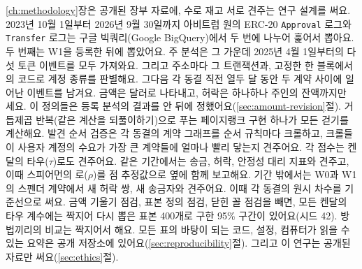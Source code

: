 \ref{ch:methodology}장은 공개된 장부 자료에, 수로 재고 서로 견주는 연구 설계를 써요. 2023년 10월 1일부터 2026년 9월 30일까지 아비트럼 원의 ERC-20 \texttt{Approval} 로그와 \texttt{Transfer} 로그는 구글 빅쿼리(Google BigQuery)에서 두 번에 나누어 훑어서 뽑아요. 두 번째는 W1을 등록한 뒤에 뽑았어요. 주 분석은 그 가운데 2025년 4월 1일부터의 다섯 토큰 이벤트를 모두 가져와요. 그리고 주소마다 그 트랜잭션과, 고정한 한 블록에서의 코드로 계정 종류를 판별해요. 그다음 각 동결 직전 열두 달 동안 두 계약 사이에 일어난 이벤트를 남겨요. 금액은 달러로 나타내고, 허락은 하나하나 주인의 잔액까지만 세요. 이 정의들은 등록 분석의 결과를 안 뒤에 정했어요(\ref{sec:amount-revision}절). 거듭제곱 반복(같은 계산을 되풀이하기)으로 푸는 페이지랭크 구현 하나가 모든 걷기를 계산해요. 발견 순서 검증은 각 동결의 계약 그래프를 순서 규칙마다 크롤하고, 크롤들이 사용자 계정의 수요가 가장 큰 계약들에 얼마나 빨리 닿는지 견주어요. 각 점수는 켄달의 타우($\tau$)로도 견주어요. 같은 기간에서는 송금, 허락, 안정성 대리 지표와 견주고, 이때 스피어먼의 로($\rho$)를 점 추정값으로 옆에 함께 보고해요. 기간 밖에서는 W0과 W1의 스펜더 계약에서 새 허락 쌍, 새 송금자와 견주어요. 이때 각 동결의 원시 차수를 기준선으로 써요. 금액 기울기 점검, 표본 정의 점검, 닫힌 꼴 점검을 빼면, 모든 켄달의 타우 계수에는 짝지어 다시 뽑은 표본 400개로 구한 95\% 구간이 있어요(시드 42). 방법끼리의 비교는 짝지어서 해요. 모든 표의 바탕이 되는 코드, 설정, 컴퓨터가 읽을 수 있는 요약은 공개 저장소에 있어요(\ref{sec:reproducibility}절). 그리고 이 연구는 공개된 자료만 써요(\ref{sec:ethics}절).


